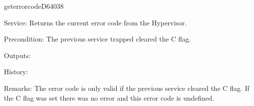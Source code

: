 \begin{hyppotrap}{geterrorcode}{D640}{38}
\item [Service:]
  Returns the current error code from the Hypervisor.
\item [Precondition:]
  The previous service trapped cleared the C flag.
\item [Outputs:]
\item [History:]
\item [Remarks:]
  The error code is only valid if the previous service cleared the C flag.
  If the C flag was set there was no error and this error code is undefined.


\end{hyppotrap}
